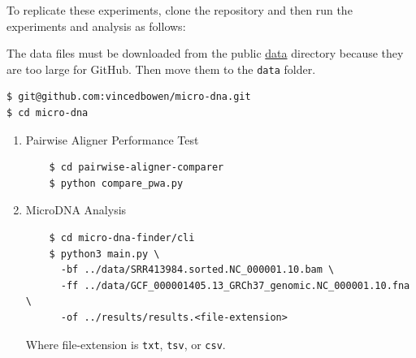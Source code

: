 \documentclass[11pt, letterpaper]{article}
\begin{document}
To replicate these experiments, clone the repository and then run the
experiments and analysis as follows:

The data files must be downloaded from the public \href{https://drive.google.com/drive/folders/1WYPwCzSv__28iQlHwvZUZpNlmjTM7Fea}{data} directory because they are too large for GitHub. Then move them to the \verb|data| folder.
\begin{verbatim}
$ git@github.com:vincedbowen/micro-dna.git
$ cd micro-dna
\end{verbatim}
\begin{enumerate}
    \item Pairwise Aligner Performance Test 
    \begin{verbatim}
    $ cd pairwise-aligner-comparer
    $ python compare_pwa.py
    \end{verbatim}
    \item MicroDNA Analysis
    \begin{verbatim}
    $ cd micro-dna-finder/cli
    $ python3 main.py \
      -bf ../data/SRR413984.sorted.NC_000001.10.bam \
      -ff ../data/GCF_000001405.13_GRCh37_genomic.NC_000001.10.fna \
      -of ../results/results.<file-extension>
    \end{verbatim}
    Where file-extension is \verb|txt|, \verb|tsv|, or \verb|csv|.
\end{enumerate}
\end{document}
